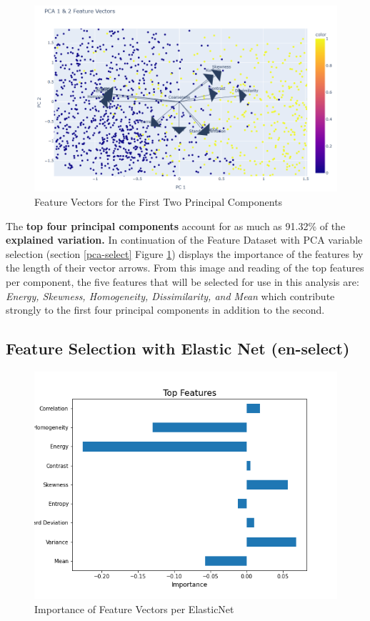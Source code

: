 \documentclass{article}
\begin{document}
\begin{figure}[H]
    \centering
    \includegraphics[width = .9\textwidth]{images/feat_vectors.png}
    \caption{Feature Vectors for the First Two Principal Components}
    \label{feat_vects-varExp}
\end{figure}

The \textbf{top four principal components} account for as much as 91.32\% of the \textbf{explained variation.}  In continuation of the Feature Dataset with PCA variable selection (section \ref{pca-select} Figure \ref{feat_vects-varExp}) displays the importance of the features by the length of their vector arrows. From this image and reading of the top features per component, the five features that will be selected for use in this analysis are: \textit{Energy, Skewness, Homogeneity, Dissimilarity, and Mean} which contribute strongly to the first four principal components in addition to the second.


\subsection{Feature Selection with Elastic Net (en-select)}

\begin{figure}[H]
    \centering
    \includegraphics[width = .9\textwidth]{images/eNet_top_feats.png}
    \caption{Importance of Feature Vectors per ElasticNet}
    \label{en-feature}
\end{figure}
\end{document}

